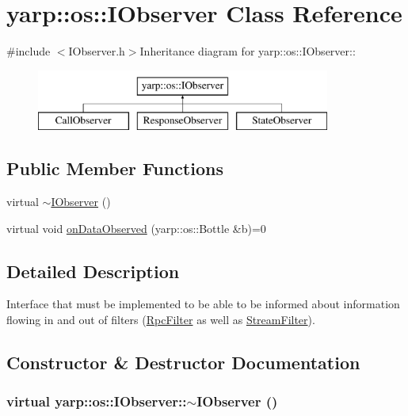 \hypertarget{classyarp_1_1os_1_1_i_observer}{
\section{yarp::os::IObserver Class Reference}
\label{classyarp_1_1os_1_1_i_observer}
}


{\ttfamily \#include $<$IObserver.h$>$}Inheritance diagram for yarp::os::IObserver::\begin{figure}[H]
\begin{center}
\leavevmode
\includegraphics[height=2cm]{classyarp_1_1os_1_1_i_observer}
\end{center}
\end{figure}
\subsection*{Public Member Functions}
\begin{DoxyCompactItemize}
\item 
virtual \hyperlink{classyarp_1_1os_1_1_i_observer_a6e20a4a7baa318b53d6a7e3f198699f6}{$\sim$IObserver} ()
\item 
virtual void \hyperlink{classyarp_1_1os_1_1_i_observer_a4829e5a6f2ba6666b9539a4a30f20790}{onDataObserved} (yarp::os::Bottle \&b)=0
\end{DoxyCompactItemize}


\subsection{Detailed Description}
Interface that must be implemented to be able to be informed about information flowing in and out of filters (\hyperlink{classyarp_1_1os_1_1_rpc_filter}{RpcFilter} as well as \hyperlink{classyarp_1_1os_1_1_stream_filter}{StreamFilter}). 

\subsection{Constructor \& Destructor Documentation}
\hypertarget{classyarp_1_1os_1_1_i_observer_a6e20a4a7baa318b53d6a7e3f198699f6}{
\subsubsection[{$\sim$IObserver}]{\setlength{\rightskip}{0pt plus 5cm}virtual yarp::os::IObserver::$\sim$IObserver ()}}
\label{classyarp_1_1os_1_1_i_observer_a6e20a4a7baa318b53d6a7e3f198699f6}


